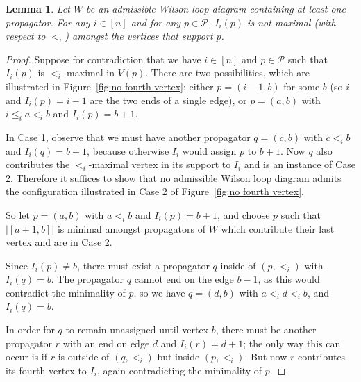 \documentclass[11pt]{article}
\newcommand{\cP}{\mathcal{P}}
\newtheorem{lem}[thm]{Lemma}
\theoremstyle{remark}
\theoremstyle{definition}
\begin{document}
\begin{lem}\label{lem no fourth vertex}
Let $W$ be an admissible Wilson loop diagram containing at least one propagator. For any $i \in [n]$ and for any $p \in \cP$, $I_i(p)$ is not maximal (with respect to $<_i$) amongst the vertices that support $p$.
\end{lem} 
\begin{proof}
Suppose for contradiction that we have $i \in [n]$ and $p \in \cP$ such that $I_i(p)$ is $<_i$-maximal in $V(p)$. There are two possibilities, which are illustrated in Figure~\ref{fig:no fourth vertex}: either $p = (i-1,b)$ for some $b$ (so $i$ and $I_i(p) = i-1$ are the two ends of a single edge), or $p = (a,b)$ with $i\leq_i a <_i b$ and $I_i(p) = b+1$. 

In Case 1, observe that we must have another propagator $q = (c,b)$ with $c<_i b$ and $I_i(q) = b+1$, because otherwise $I_i$ would assign $p$ to $b+1$. Now $q$ also contributes the $<_i$-maximal vertex in its support to $I_i$ and is an instance of Case 2. Therefore it suffices to show that no admissible Wilson loop diagram admits the configuration illustrated in Case 2 of Figure~\ref{fig:no fourth vertex}. 

So let $p = (a,b)$ with $a<_ib$ and $I_i(p) = b+1$, and choose $p$ such that $\big|[a+1,b]\big|$ is minimal amongst propagators of $W$ which contribute their last vertex and are in Case 2.

Since $I_i(p) \neq b$, there must exist a propagator $q$ inside of $(p,<_i)$ with $I_i(q) = b$. The propagator $q$ cannot end on the edge $b-1$, as this would contradict the minimality of $p$, so we have $q = (d,b)$ with $a <_i d <_i b$, and $I_i(q) = b$. 

In order for $q$ to remain unassigned until vertex $b$, there must be another propagator $r$ with an end on edge $d$ and $I_i(r) = d+1$; the only way this can occur is if $r$ is outside of $(q,<_i)$ but inside $(p,<_i)$. But now $r$ contributes its fourth vertex to $I_i$, again contradicting the minimality of $p$.
\end{proof}
\end{document}
